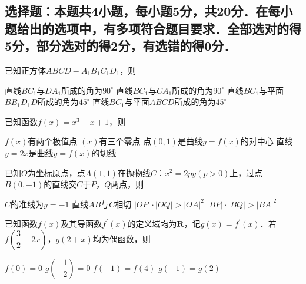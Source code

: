 \documentclass[11pt,addpoints,answers]{exam}
\begin{document}
\begin{multicols}{3}
\begin{questions}
        \section{选择题：本题共4小题，每小题5分，共20分．在每小题给出的选项中，有多项符合题目要求．全部选对的得5分，部分选对的得2分，有选错的得0分．}

        \question
        已知正方体$ABCD-A_1B_1C_1D_1$，则

        \begin{choices}
            \choice 直线$BC_1$与$DA_1$所成的角为$90^{\circ}$
            \choice 直线$BC_1$与$CA_1$所成的角为$90^{\circ}$
            \choice 直线$BC_1$与平面$BB_1D_1D$所成的角为$45^{\circ}$
            \choice 直线$BC_1$与平面$ABCD$所成的角为$45^{\circ}$
        \end{choices}

        \question
        已知函数$f\left(x\right)=x^3-x+1$，则

        \begin{choices}
            \choice $f\left(x\right)$有两个极值点
            \choice $\left(x\right)$有三个零点
            \choice 点$\left(0,1\right)$是曲线$y=f\left(x\right)$的对中心
            \choice 直线$y=2x$是曲线$y=f\left(x\right)$的切线
        \end{choices}

        \question
        已知$O$为坐标原点，点$A\left(1,1\right)$在抛物线$C$：$x^2=2py\left(p>0\right)$上，过点$B\left(0,-1\right)$的直线交$C$于$P$，$Q$两点，则

        \begin{choices}
            \choice $C$的准线为$y=-1$
            \choice 直线$AB$与$C$相切
            \choice $\left|OP\right|\cdot\left|OQ\right|>\left|OA\right|^{2}$
            \choice $\left|BP\right|\cdot\left|BQ\right|>\left|BA\right|^{2}$
        \end{choices}

        \question
        已知函数$f\left(x\right)$及其导函数$f^{\prime}\left(x\right)$的定义域均为$\mathbf{R}$，记$g\left(x\right)=f^{\prime}\left(x\right)$．若$f\left(\dfrac{3}{2}-2x\right)$，$g\left(2+x\right)$均为偶函数，则

        \begin{choices}
            \choice $f\left(0\right)=0$
            \choice $g\left(-\dfrac{1}{2}\right)=0$
            \choice $f\left(-1\right)=f\left(4\right)$
            \choice $g\left(-1\right)=g\left(2\right)$
        \end{choices}


\end{questions}
\end{multicols}
\end{document}
